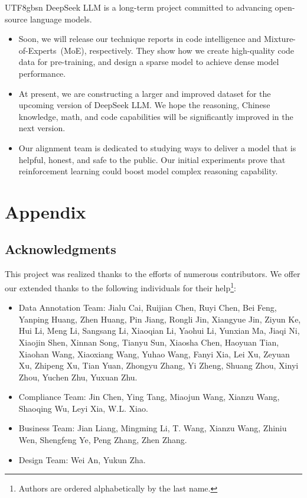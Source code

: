 \documentclass[11pt, a4paper, logo, copyright, nonumbering]{deepseek}
\begin{document}
\begin{CJK*}{UTF8}{gbsn}
DeepSeek LLM is a long-term project committed to advancing open-source language models.

\begin{itemize}
    \item 
    Soon, we will release our technique reports in code intelligence and  Mixture-of-Experts~(MoE), respectively. They show how we create high-quality code data for pre-training, and design a sparse model to achieve dense model performance. 
    \item At present, we are constructing a larger and improved dataset for the upcoming version of DeepSeek LLM. We hope the reasoning, Chinese knowledge, math, and code capabilities will be significantly improved in the next version.  
    \item Our alignment team is dedicated to studying ways to deliver a model that is helpful, honest, and safe to the public. Our initial experiments prove that reinforcement learning could boost model complex reasoning capability.
    
\end{itemize}



\newpage
\appendix

\section{Appendix}

\subsection{Acknowledgments}
This project was realized thanks to the efforts of numerous contributors. We offer our extended thanks to the following individuals for their help\footnote{Authors are ordered alphabetically by the last name.}:
\begin{itemize}
    \item Data Annotation Team: Jialu Cai, Ruijian Chen, Ruyi Chen, Bei Feng, Yanping Huang, Zhen Huang, Pin Jiang, Rongli Jin, Xiangyue Jin, Ziyun Ke, Hui Li, Meng Li, Sangsang Li, Xiaoqian Li, Yaohui Li, Yunxian Ma, Jiaqi Ni, Xiaojin Shen, Xinnan Song, Tianyu Sun, Xiaosha Chen, Haoyuan Tian, Xiaohan Wang, Xiaoxiang Wang, Yuhao Wang, Fanyi Xia, Lei Xu, Zeyuan Xu, Zhipeng Xu, Tian Yuan, Zhongyu Zhang, Yi Zheng, Shuang Zhou, Xinyi Zhou, Yuchen Zhu, Yuxuan Zhu.
    \item Compliance Team: Jin Chen, Ying Tang, Miaojun Wang, Xianzu Wang, Shaoqing Wu, Leyi Xia, W.L. Xiao.
    \item Business Team: Jian Liang, Mingming Li, T. Wang, Xianzu Wang, Zhiniu Wen, Shengfeng Ye, Peng Zhang, Zhen Zhang.
    \item Design Team: Wei An, Yukun Zha.
\end{itemize}


\end{CJK*}
\end{document}
